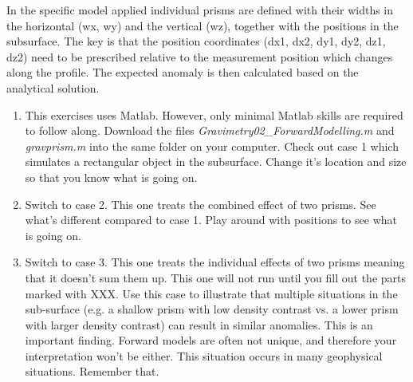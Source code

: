 In the specific model applied individual prisms are defined with their widths in the horizontal (wx, wy) and the vertical (wz), together with the positions in the subsurface. The key is that the position coordinates (dx1, dx2, dy1, dy2, dz1, dz2) need to be prescribed relative to the measurement position which changes along the profile. The expected anomaly is then calculated based on the analytical solution.
\begin{enumerate}[label=(\alph*)]

  \item This exercises uses Matlab. However, only minimal Matlab skills are required to follow along. Download the files \textit{Gravimetry02\_ForwardModelling.m} and \textit{gravprism.m} into the same folder on your computer. Check out case 1 which simulates a rectangular object in the subsurface. Change it's location and size so that you know what is going on.

  \item Switch to case 2. This one treats the combined effect of two prisms. See what's different compared to case 1. Play around with positions to see what is going on.

  \item Switch to case 3. This one treats the individual effects of two prisms meaning that it doesn't sum them up. This one will not run until you fill out the parts marked with XXX. Use this case to illustrate that multiple situations in the sub-surface (e.g. a shallow prism with low density contrast vs. a lower prism with larger density contrast) can result in similar anomalies. This is an important finding. Forward models are often not unique, and therefore your interpretation won't be either. This situation occurs in many geophysical situations. Remember that.
\end{enumerate}
\ifanswers
\begin{tcolorbox}[enhanced jigsaw,breakable,pad at break*=1mm,
  colback=blue!5!white,colframe=babyblueeyes,title=Solutions,
  watermark color=white]
  
\end{tcolorbox}
\fi
